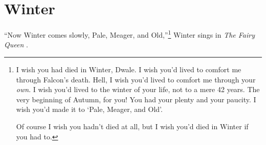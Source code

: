 \documentclass[12pt]{memoir}
\begin{document}

\clearpage

\section*{Winter}

``Now Winter comes slowly, Pale, Meager, and Old,''\footnote{I wish you had died in Winter, Dwale. I wish you'd lived to comfort me through Falcon's death. Hell, I wish you'd lived to comfort me through your \emph{own}. I wish you'd lived to the winter of your life, not to a mere 42 years. The very beginning of Autumn, for you! You had your plenty and your paucity. I wish you'd made it to `Pale, Meager, and Old'.\par Of course I wish you hadn't died at all, but I wish you'd died in Winter if you had to.} Winter sings in \emph{The Fairy Queen} \parencite{purcell}.
\end{document}
